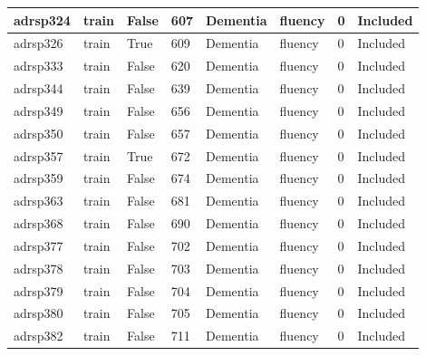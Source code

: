 \begin{center}
\begin{longtable}{|l|l|l|l|l|l|l|l|}
adrsp324       & train                 & False             & 607     & Dementia       & fluency         & 0            & Included      \\ \hline
adrsp326       & train                 & True              & 609     & Dementia       & fluency         & 0            & Included      \\ \hline
adrsp333       & train                 & False             & 620     & Dementia       & fluency         & 0            & Included      \\ \hline
adrsp344       & train                 & False             & 639     & Dementia       & fluency         & 0            & Included      \\ \hline
adrsp349       & train                 & False             & 656     & Dementia       & fluency         & 0            & Included      \\ \hline
adrsp350       & train                 & False             & 657     & Dementia       & fluency         & 0            & Included      \\ \hline
adrsp357       & train                 & True              & 672     & Dementia       & fluency         & 0            & Included      \\ \hline
adrsp359       & train                 & False             & 674     & Dementia       & fluency         & 0            & Included      \\ \hline
adrsp363       & train                 & False             & 681     & Dementia       & fluency         & 0            & Included      \\ \hline
adrsp368       & train                 & False             & 690     & Dementia       & fluency         & 0            & Included      \\ \hline
adrsp377       & train                 & False             & 702     & Dementia       & fluency         & 0            & Included      \\ \hline
adrsp378       & train                 & False             & 703     & Dementia       & fluency         & 0            & Included      \\ \hline
adrsp379       & train                 & False             & 704     & Dementia       & fluency         & 0            & Included      \\ \hline
adrsp380       & train                 & False             & 705     & Dementia       & fluency         & 0            & Included      \\ \hline
adrsp382       & train                 & False             & 711     & Dementia       & fluency         & 0            & Included      \\ \hline

\end{longtable}
\end{center}

